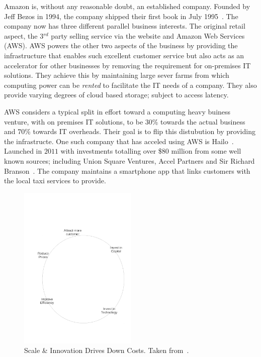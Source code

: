 {}

Amazon is, without any reasonable doubt, an established company.
Founded by Jeff Bezos in 1994, the company shipped their first book in July 1995~\cite{seattle}.
The company now has three different parallel business interests.
The original retail aspect, the 3$^{rd}$ party selling service via the website and Amazon Web Services (AWS).
AWS powers the other two aspects of the business by providing the infrastructure that enables such excellent customer service but also acts as an accelerator for other businesses by removing the requirement for on-premises IT solutions.
They achieve this by maintaining large sever farms from which computing power can be \emph{rented} to facilitate the IT needs of a company.
They also provide varying degrees of cloud based storage; subject to access latency.

AWS considers a typical split in effort toward a computing heavy buiness venture, with on premises IT solutions, to be $30$\% towards the actual business and $70$\% towards IT overheads. 
Their goal is to flip this distubution by providing the infrastructe. 
One such company that has acceled using AWS is Hailo~\cite{gavin2014ams}.
Launched in $2011$ with investments totalling over \$$80$ million from some well known sources; including Union Square Ventures, Accel Partners and Sir Richard Branson~\cite{hailo}.
The company maintains a smartphone app that links customers with the local taxi services to provide.




\begin{figure}
	\centering
	\includegraphics[width=0.5\textwidth]{./Figures/ScaleInnovation.pdf}
	\caption{Scale \& Innovation Drives Down Costs. Taken from~\cite{gavin2014ams}.}
	\label{fig:ScaleInnovation}
\end{figure}

